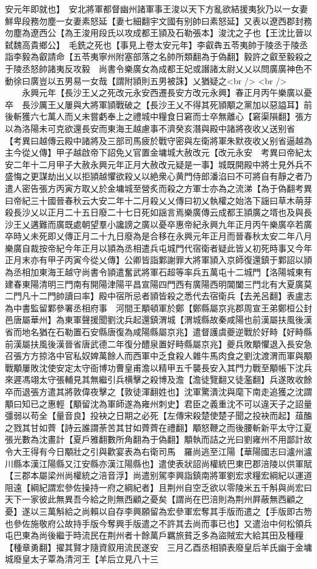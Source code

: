 安元年即就也】　安北將軍都督幽州諸軍事王浚以天下方亂欲結援夷狄乃以一女妻鮮卑段務勿塵一女妻素怒延【妻七細翻宇文國有别帥曰素怒延】又表以遼西郡封務勿塵為遼西公【為王浚用段氏以攻成都王頴及石勒張本】浚沈之子也【王沈比晉以弑魏高貴鄉公】　毛銑之死也【事見上卷太安元年】李叡犇五苓夷帥于陵丞于陵丞詣李毅為叡請命【五苓夷寧州附塞部落之名帥所類翻為于偽翻】毅許之叡至毅殺之于陵丞怒帥諸夷反攻毅　尚書令樂廣女為成都王妃或譖諸太尉乂乂以問廣廣神色不動徐曰廣豈以五男易一女哉【謂附頴則五男被誅】乂猶疑之<br />
<br />
　　永興元年【長沙王乂之死改元永安西遷長安方改元永興】春正月丙午樂廣以憂卒　長沙厲王乂屢與大將軍頴戰破之【長沙王乂不得其死頴顒之黨加以惡謚耳】前後斬獲六七萬人而乂未嘗虧奉上之禮城中糧食日窘而士卒無離心【窘渠隕翻】張方以為洛陽未可克欲還長安而東海王越慮事不濟癸亥潛與殿中諸將夜收乂送别省　【考異曰越傳云殿中諸將及三部司馬疲於戰守密與左衛將軍朱默夜收乂别省逼越為主今從乂傳】甲子越啟帝下詔免乂官置金墉城大赦改元【改元永安　考異曰帝紀太安二年十二月甲子大赦永興元年正月大赦改元疑是一事】城既開殿中將士見外兵不盛悔之更謀劫出乂以拒頴越懼欲殺乂以絶衆心黄門侍郎潘淊曰不可將自有靜之者乃遣人密告張方丙寅方取乂於金墉城至營炙而殺之方軍士亦為之流涕【為于偽翻考異曰帝紀三十國晉春秋云大安二年十二月殺乂乂傳曰初乂執權之始洛下謡曰草木萌芽殺長沙乂以正月二十五日廢二十七日死如謡言焉樂廣傳云成都王頴廣之壻也及與長沙王乂遘難而廣既處朝望羣小讒謗之廣以憂卒惠帝紀永興九年正月丙午樂廣卒若廣卒時乂未死即乂傳正月二十九日廢為是合移在永興元年正月而晉春秋太安二年八月樂廣自裁按帝紀今年正月以頴為丞相遣兵屯城門代宿衛者疑此皆乂初死時事又今年正月末亦有甲子丙寅今從乂傳】公卿皆詣鄴謝罪大將軍頴入京師復還鎮于鄴詔以頴為丞相加東海王越守尚書令頴遣奮武將軍石超等率兵五萬屯十二城門【洛陽城東有建春東陽清明三門南有開陽津陽平昌宣陽四門西有廣陽西明閶闔三門北有大夏廣莫二門凡十二門帥讀曰率】殿中宿所忌者頴皆殺之悉代去宿衛兵【去羌呂翻】表盧志為中書監留鄴參署丞相府事　河間王顒頓軍於鄭【鄭縣屬京兆郡周宣王弟鄭桓公封邑唐屬華州】為東軍聲援聞劉沈兵起還鎮渭城【渭城縣故秦咸陽也前漢屬扶風後漢省而地名猶在石勒置石安縣唐復為咸陽縣屬京兆】遣督護虞夔逆戰於好畤【好畤縣前漢屬扶風後漢晉省唐武德二年復分醴泉置好畤縣屬京兆】夔兵敗顒懼退入長安急召張方方掠洛中官私奴婢萬餘人而西軍中乏食殺人雜牛馬肉食之劉沈渡渭而軍與顒戰顒屢敗沈使安定太守衙博功曹皇甫澹以精甲五千襲長安入其門力戰至顒帳下沈兵來遲馮翊太守張輔見其無繼引兵横擊之殺博及澹【澹徒覽翻又徒濫翻】兵遂敗收餘卒而退張方遣其將敦偉夜擊之【敦徒渾翻姓也】沈軍驚潰沈與麾下南走追獲之沈謂顒曰知已之惠輕【顒留沈為軍師遂為雍州刺史】君臣之義重沈不可以違天子之詔量彊弱以苟全【量音良】投袂之日期之必死【左傳宋殺楚使楚子聞之投袂而起】葅醢之戮其甘如薺【詩云誰謂荼苦其甘如薺薺在禮翻】顒怒鞭之而後腰斬新平太守江夏張光數為沈畫計【夏戶雅翻數所角翻為于偽翻】顒執而詰之光曰劉雍州不用鄙計故令大王得有今日顒壯之引與歡宴表為右衛司馬　羅尚逃至江陽【華陽國志曰瀘州瀘川縣本漢江陽縣又江安縣亦漢江陽縣也】遣使表狀詔尚權統巴東巴郡涪陵以供軍賦【三郡本屬梁州尚權統之涪音浮】尚遣别駕李興詣鎮南將軍劉宏求糧宏綱紀以運道阻遠【綱紀謂宏參佐操持一府之綱紀者】且荆州自空乏欲以零陵米五千斛與尚宏曰天下一家彼此無異吾今給之則無西顧之憂矣【謂尚在巴涪則為荆州屛蔽無西顧之憂】遂以三萬斛給之尚賴以自存李興願留為宏參軍宏奪其手版而遣之【手版即古笏也參佐施敬府公故持手版今奪興手版遣之不許其去尚而事已也】又遣治中何松領兵屯巴東為尚後繼于時流民在荆州者十餘萬戶羈旅貧乏多為盜賊宏大給其田及種糧【種章勇翻】擢其賢才隨資叙用流民遂安　三月乙酉丞相頴表廢皇后羊氏幽于金墉城廢皇太子覃為清河王【羊后立見八十三
